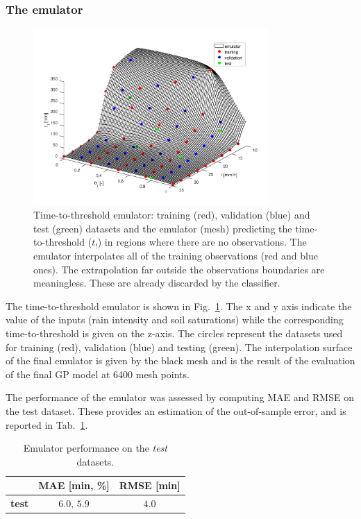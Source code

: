 \subsubsection{The emulator}
\begin{figure}[h]
  \centering
  \includegraphics[width=0.8\textwidth]{Figures/emulator.png}
  \caption{Time-to-threshold emulator: training (red), validation (blue) and test (green) datasets and the emulator (mesh) predicting the time-to-threshold ($t_!$) in regions where there are no observations. The emulator interpolates all of the training observations (red and blue ones). The extrapolation far outside the observations boundaries are meaningless. These are already discarded by the classifier.}
  \label{fig:emulator}
\end{figure}

The time-to-threshold emulator is shown in Fig.~\ref{fig:emulator}.
The x and y axis indicate the value of the inputs (rain intensity and soil saturations) while the corresponding time-to-threshold is given on the z-axis.
The circles represent the datasets used for training (red), validation (blue) and testing (green).
The interpolation surface of the final emulator is given by the black mesh and is the result of the evaluation of the final GP model at \num{6400} mesh points.

The performance of the emulator was assessed by computing MAE and RMSE on the test dataset.
These provides an estimation of the out-of-sample error, and is reported in Tab.~\ref{tab:emulator_performance}.

\begin{table}[h]
  \centering
  \caption{Emulator performance on the \emph{test} datasets.}
  \label{tab:emulator_performance}
  \begin{tabular}{lcc}
    \toprule
     & \textbf{MAE [\si{\minute}, \si{\percent}]} & \textbf{RMSE [\si{\minute}]} \\
    \midrule
    \textbf{test} & $6.0,\,5.9$ & $4.0$\\
    \bottomrule
  \end{tabular}
\end{table}

